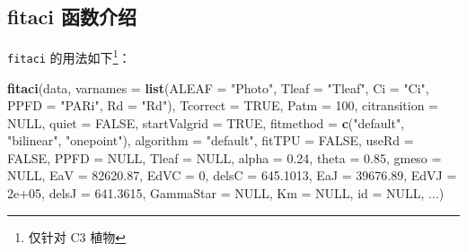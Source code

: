 \documentclass[]{krantz}
\makeatletter
\newenvironment{Shaded}{\begin{snugshade}}{\end{snugshade}}
\newcommand{\KeywordTok}[1]{\textcolor[rgb]{0.13,0.29,0.53}{\textbf{#1}}}
\newcommand{\DataTypeTok}[1]{\textcolor[rgb]{0.13,0.29,0.53}{#1}}
\newcommand{\DecValTok}[1]{\textcolor[rgb]{0.00,0.00,0.81}{#1}}
\newcommand{\FloatTok}[1]{\textcolor[rgb]{0.00,0.00,0.81}{#1}}
\newcommand{\StringTok}[1]{\textcolor[rgb]{0.31,0.60,0.02}{#1}}
\newcommand{\OtherTok}[1]{\textcolor[rgb]{0.56,0.35,0.01}{#1}}
\newcommand{\NormalTok}[1]{#1}
\newenvironment{kframe}{%
\medskip{}
\setlength{\fboxsep}{.8em}
 \def\at@end@of@kframe{}%
 \ifinner\ifhmode%
  \def\at@end@of@kframe{\end{minipage}}%
  \begin{minipage}{\columnwidth}%
 \fi\fi%
 \def\FrameCommand##1{\hskip\@totalleftmargin \hskip-\fboxsep
 \colorbox{shadecolor}{##1}\hskip-\fboxsep
     \hskip-\linewidth \hskip-\@totalleftmargin \hskip\columnwidth}%
 \MakeFramed {\advance\hsize-\width
   \@totalleftmargin\z@ \linewidth\hsize
   \@setminipage}}%
 {\par\unskip\endMakeFramed%
 \at@end@of@kframe}
\renewenvironment{Shaded}{\begin{kframe}}{\end{kframe}}
\theoremstyle{definition}
\theoremstyle{definition}
\theoremstyle{definition}
\theoremstyle{remark}
\makeatother
\begin{document}
\subsection{fitaci 函数介绍}\label{fitaci-}

\texttt{fitaci} 的用法如下\footnote{仅针对 C3 植物}：

\begin{Shaded}
\begin{Highlighting}[]
\KeywordTok{fitaci}\NormalTok{(data, }\DataTypeTok{varnames =} \KeywordTok{list}\NormalTok{(}\DataTypeTok{ALEAF =} \StringTok{"Photo"}\NormalTok{, }
  \DataTypeTok{Tleaf =} \StringTok{"Tleaf"}\NormalTok{, }\DataTypeTok{Ci =} \StringTok{"Ci"}\NormalTok{, }\DataTypeTok{PPFD =} \StringTok{"PARi"}\NormalTok{, }
  \DataTypeTok{Rd =} \StringTok{"Rd"}\NormalTok{), }\DataTypeTok{Tcorrect =} \OtherTok{TRUE}\NormalTok{, }\DataTypeTok{Patm =} \DecValTok{100}\NormalTok{, }
  \DataTypeTok{citransition =} \OtherTok{NULL}\NormalTok{, }\DataTypeTok{quiet =} \OtherTok{FALSE}\NormalTok{, }
  \DataTypeTok{startValgrid =} \OtherTok{TRUE}\NormalTok{, }\DataTypeTok{fitmethod =} 
  \KeywordTok{c}\NormalTok{(}\StringTok{"default"}\NormalTok{, }\StringTok{"bilinear"}\NormalTok{, }\StringTok{"onepoint"}\NormalTok{), }
  \DataTypeTok{algorithm =} \StringTok{"default"}\NormalTok{, }\DataTypeTok{fitTPU =} \OtherTok{FALSE}\NormalTok{, }
  \DataTypeTok{useRd =} \OtherTok{FALSE}\NormalTok{, }\DataTypeTok{PPFD =} \OtherTok{NULL}\NormalTok{, }\DataTypeTok{Tleaf =} \OtherTok{NULL}\NormalTok{, }
  \DataTypeTok{alpha =} \FloatTok{0.24}\NormalTok{, }\DataTypeTok{theta =} \FloatTok{0.85}\NormalTok{, }\DataTypeTok{gmeso =} \OtherTok{NULL}\NormalTok{, }
  \DataTypeTok{EaV =} \FloatTok{82620.87}\NormalTok{, }\DataTypeTok{EdVC =} \DecValTok{0}\NormalTok{, }\DataTypeTok{delsC =} \FloatTok{645.1013}\NormalTok{,}
  \DataTypeTok{EaJ =} \FloatTok{39676.89}\NormalTok{, }\DataTypeTok{EdVJ =} \FloatTok{2e+05}\NormalTok{, }
  \DataTypeTok{delsJ =} \FloatTok{641.3615}\NormalTok{, }\DataTypeTok{GammaStar =} \OtherTok{NULL}\NormalTok{, }
  \DataTypeTok{Km =} \OtherTok{NULL}\NormalTok{, }\DataTypeTok{id =} \OtherTok{NULL}\NormalTok{, ...)}


\end{Highlighting}
\end{Shaded}
\end{document}
